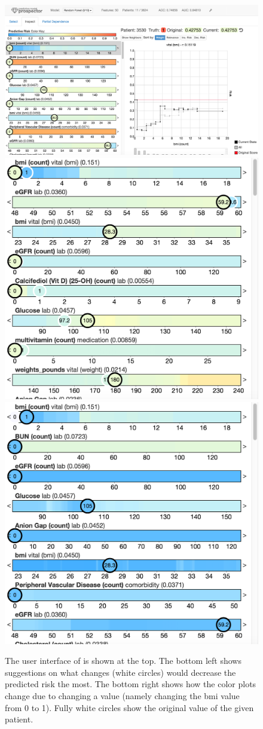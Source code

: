 \begin{figure}[t]
\centering
\includegraphics[width=0.8\linewidth]{prospector/ui_inspect} %
\\
\vspace*{0.75em} %
\includegraphics[width=0.3\linewidth]{prospector/ui_sugg} %
\hspace*{0.2\linewidth} %
\includegraphics[width=0.3\linewidth]{prospector/ui_change} %
\caption[The user interface of \prospector.]{
The user interface of \prospector is shown at the top.
The bottom left shows suggestions on what changes (white circles) would decrease the
predicted risk the most.
The bottom right shows how the color plots change due to changing a value (namely changing the
bmi value from 0 to 1).
Fully white circles show the original value of the given patient.
}
\label{figs:ui}
\end{figure}